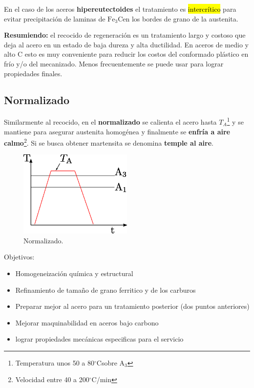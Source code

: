 \documentclass{article}
\newcommand{\Athree}{A\ensuremath{_{3}}}
\newcommand{\grad}{\ensuremath{^\circ \mathrm{C}}}
\newcommand{\cementita}{\ensuremath{\mathrm{Fe}_3 \mathrm{C}}}
\begin{document}
En el caso de los aceros \textbf{hipereutectoides} el tratamiento es \hl{intercrítico} para evitar precipitación de laminas de \cementita en los bordes de grano de la austenita.

\textbf{Resumiendo:} el recocido de regeneración es un tratamiento largo y costoso que deja al acero en un estado de baja dureza y alta ductilidad. En aceros de medio y alto C esto es muy conveniente para reducir los costos del conformado plástico en frío y/o del mecanizado. Menos frecuentemente se puede usar para lograr propiedades finales.

\subsection{Normalizado}
Similarmente al recocido, en el \textbf{normalizado} se calienta el acero hasta $T_A$\footnote{Temperatura unos 50 a 80\grad sobre \Athree} y se mantiene para asegurar austenita homogénea y finalmente se \textbf{enfría a aire calmo}\footnote{Velocidad entre 40 a 200\grad/min}. Si se busca obtener martensita se denomina \textbf{temple al aire}.

\begin{figure}[htb!]
    \centering
    \includegraphics[width=0.5\textwidth]{fig/TTnorm.eps}
    \caption{Normalizado.}
    \label{fig:TTnorm}
\end{figure}

Objetivos:
\begin{itemize}
    \item Homogeneización química y estructural
    \item Refinamiento de tamaño de grano ferritico y de los carburos
    \item Preparar mejor al acero para un tratamiento posterior (dos puntos anteriores)
    \item Mejorar maquinabilidad en aceros bajo carbono
    \item lograr propiedades mecánicas especificas para el servicio
\end{itemize}
\end{document}
